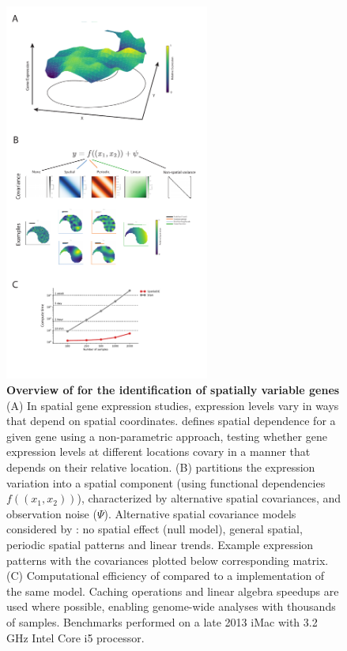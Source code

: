 \begin{figure}
    \centering
    \includegraphics[width=0.6\textwidth]{"Figure 1"}
    \caption[Overview of  for the identification of spatially variable genes]{\textbf{Overview of  for the identification of spatially variable genes} (A)  In spatial gene expression studies, expression levels vary in ways that depend on spatial coordinates.  defines spatial dependence for a given gene using a non-parametric approach, testing whether gene expression levels at different locations covary in a manner that depends on their relative location. (B)  partitions the expression variation into a spatial component (using functional dependencies \( f((x_1, x_2)) \)), characterized by alternative spatial covariances, and observation noise (\( \Psi \)). Alternative spatial covariance models considered by : no spatial effect (null model), general spatial, periodic spatial patterns and linear trends. Example expression patterns with the covariances plotted below corresponding matrix. (C) Computational efficiency of  compared to a  implementation of the same model. Caching operations and linear algebra speedups are used where possible, enabling genome-wide analyses with thousands of samples. Benchmarks performed on a late 2013 iMac with 3.2 GHz Intel Core i5 processor.}
    \label{fig:spatialde}
\end{figure}

